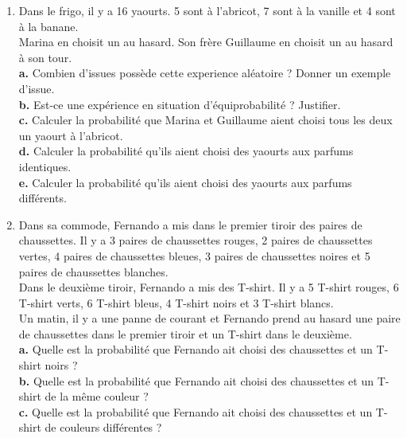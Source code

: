 {\begin{Exercice}
\leavevmode\vspace{-\baselineskip}
\begin{enumerate}[itemsep=2em]
	\item \begin{minipage}[t]{\linewidth}Dans le frigo, il y a 16 yaourts. 5 sont à l'abricot, 7 sont à la vanille et 4 sont à la banane.\\Marina en choisit un au hasard. Son frère Guillaume en choisit un au hasard à son tour.\\\textbf {a.}  Combien d'issues possède cette experience aléatoire ? Donner un exemple d'issue.\\\textbf {b.}  Est-ce une expérience en situation d'équiprobabilité ? Justifier.\\\textbf {c.}  Calculer la probabilité que Marina et Guillaume aient choisi tous les deux un yaourt à l'abricot.\\\textbf {d.}  Calculer la probabilité qu'ils aient choisi des yaourts aux parfums identiques.\\\textbf {e.}  Calculer la probabilité qu'ils aient choisi des yaourts aux parfums différents.\end{minipage}
	\item \begin{minipage}[t]{\linewidth}Dans sa commode, Fernando a mis dans le premier tiroir des paires de chaussettes. Il y a 3 paires de chaussettes rouges, 2 paires de chaussettes vertes, 4 paires de chaussettes bleues, 3 paires de chaussettes noires et 5 paires de chaussettes blanches.\\Dans le deuxième tiroir, Fernando a mis des T-shirt. Il y a 5 T-shirt rouges, 6 T-shirt verts, 6 T-shirt bleus, 4 T-shirt noirs et 3 T-shirt blancs.\\Un matin, il y a une panne de courant et Fernando prend au hasard une paire de chaussettes dans le premier tiroir et un T-shirt dans le deuxième.\\\textbf {a.}  Quelle est la probabilité que Fernando ait choisi des chaussettes et un T-shirt noirs ?\\\textbf {b.}  Quelle est la probabilité que Fernando ait choisi des chaussettes et un T-shirt de la même couleur ?\\\textbf {c.}  Quelle est la probabilité que Fernando ait choisi des chaussettes et un T-shirt de couleurs différentes ?\end{minipage}

\end{enumerate}
\end{Exercice}}
